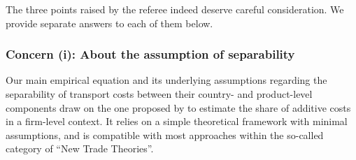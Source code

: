 \documentclass[a4paper,11pt]{article}
\begin{document}


The three points raised by the referee indeed deserve careful consideration. We provide separate answers to each of them below.


\subsubsection{Concern (i): About the assumption of separability}
Our main empirical equation and its underlying assumptions regarding the separability of transport costs between their country- and product-level components draw on the one proposed by \citet{Irrazabal_2015} to estimate the share of additive costs in a firm-level context. It relies on a simple theoretical framework with minimal assumptions, and is compatible with most approaches within the so-called category of ``New Trade Theories''.
\end{document}

